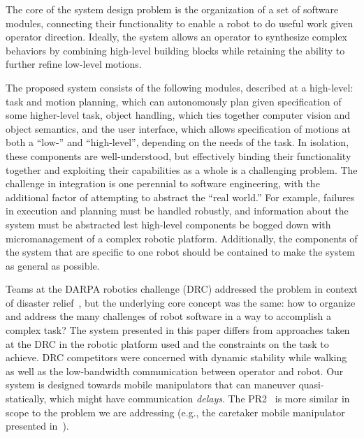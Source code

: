 
The core of the system design problem is the organization of a set of software modules, connecting their functionality to enable a robot to do useful work given operator direction.
Ideally, the system allows an operator to synthesize complex behaviors by combining high-level building blocks while retaining the ability to further refine low-level motions.

The proposed system consists of the following modules, described at a high-level:
  task and motion planning, which can autonomously plan given specification of some higher-level task,
  object handling, which ties together computer vision and object semantics,
  and the user interface, which allows specification of motions at both a ``low-'' and ``high-level'', depending on the needs of the task.
In isolation, these components are well-understood, but effectively binding their functionality together and exploiting their capabilities as a whole is a challenging problem.
The challenge in integration is one perennial to software engineering, with the additional factor of attempting to abstract the ``real world.''
For example, failures in execution and planning must be handled robustly, and information about the system must be abstracted lest high-level components be bogged down with micromanagement of a complex robotic platform.
Additionally, the components of the system that are specific to one robot should be contained to make the system as general as possible.

Teams at the DARPA robotics challenge (DRC) addressed the problem in context of disaster relief~\cite{Johnson2015, Kohlbrecher2015, Yanco2015, atkeson2015no, Karumanchi2017}, but the underlying core concept was the same:
  how to organize and address the many challenges of robot software in a way to accomplish a complex task?
The system presented in this paper differs from approaches taken at the DRC in the robotic platform used and the constraints on the task to achieve.
DRC competitors were concerned with dynamic stability while walking as well as the low-bandwidth communication between operator and robot.
Our system is designed towards mobile manipulators that can maneuver quasi-statically, which might have communication \emph{delays}.
The PR2~\cite{Cousins2010} is more similar in scope to the problem we are addressing (e.g., the caretaker mobile manipulator presented in~\cite{FISCHINGER201660}).

